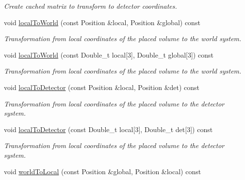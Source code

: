 \begin{DoxyCompactItemize}
\begin{DoxyCompactList}\small\item\em Create cached matrix to transform to detector coordinates. \item\end{DoxyCompactList}\item 
void \hyperlink{class_d_d4hep_1_1_alignments_1_1_alignment_decorator_aaa330822ce6701a70f5b1b2c11b2ec63}{localToWorld} (const Position \&local, Position \&global) const 
\begin{DoxyCompactList}\small\item\em Transformation from local coordinates of the placed volume to the world system. \item\end{DoxyCompactList}\item 
void \hyperlink{class_d_d4hep_1_1_alignments_1_1_alignment_decorator_abd034c9893024823ceccda4994fdedac}{localToWorld} (const Double\_\-t local\mbox{[}3\mbox{]}, Double\_\-t global\mbox{[}3\mbox{]}) const 
\begin{DoxyCompactList}\small\item\em Transformation from local coordinates of the placed volume to the world system. \item\end{DoxyCompactList}\item 
void \hyperlink{class_d_d4hep_1_1_alignments_1_1_alignment_decorator_a1be4d8fa4b9ce399e5e73e0d6bce00d6}{localToDetector} (const Position \&local, Position \&det) const 
\begin{DoxyCompactList}\small\item\em Transformation from local coordinates of the placed volume to the detector system. \item\end{DoxyCompactList}\item 
void \hyperlink{class_d_d4hep_1_1_alignments_1_1_alignment_decorator_a70b8675b30dc74918eae23bd1d161d24}{localToDetector} (const Double\_\-t local\mbox{[}3\mbox{]}, Double\_\-t det\mbox{[}3\mbox{]}) const 
\begin{DoxyCompactList}\small\item\em Transformation from local coordinates of the placed volume to the detector system. \item\end{DoxyCompactList}\item 
void \hyperlink{class_d_d4hep_1_1_alignments_1_1_alignment_decorator_adc00acec193333d4ddbc4802c8ca72b8}{worldToLocal} (const Position \&global, Position \&local) const 

\end{DoxyCompactItemize}
